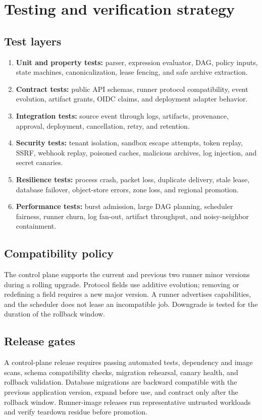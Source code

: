 \section{Testing and verification strategy}

\subsection{Test layers}

\begin{enumerate}
  \item \textbf{Unit and property tests:} parser, expression evaluator, DAG, policy inputs,
        state machines, canonicalization, lease fencing, and safe archive extraction.
  \item \textbf{Contract tests:} public API schemas, runner protocol compatibility,
        event evolution, artifact grants, OIDC claims, and deployment adapter behavior.
  \item \textbf{Integration tests:} source event through logs, artifacts, provenance,
        approval, deployment, cancellation, retry, and retention.
  \item \textbf{Security tests:} tenant isolation, sandbox escape attempts, token replay,
        SSRF, webhook replay, poisoned caches, malicious archives, log injection, and secret canaries.
  \item \textbf{Resilience tests:} process crash, packet loss, duplicate delivery, stale
        lease, database failover, object-store errors, zone loss, and regional promotion.
  \item \textbf{Performance tests:} burst admission, large DAG planning, scheduler fairness,
        runner churn, log fan-out, artifact throughput, and noisy-neighbor containment.
\end{enumerate}

\subsection{Compatibility policy}

The control plane supports the current and previous two runner minor versions during a
rolling upgrade. Protocol fields use additive evolution; removing or redefining a field
requires a new major version. A runner advertises capabilities, and the scheduler does
not lease an incompatible job. Downgrade is tested for the duration of the rollback window.

\subsection{Release gates}

A control-plane release requires passing automated tests, dependency and image scans,
schema compatibility checks, migration rehearsal, canary health, and rollback validation.
Database migrations are backward compatible with the previous application version,
expand before use, and contract only after the rollback window. Runner-image releases
run representative untrusted workloads and verify teardown residue before promotion.

